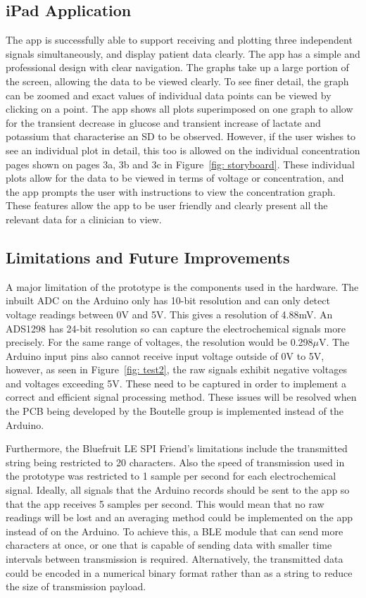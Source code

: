 \subsection{iPad Application}
The app is successfully able to support receiving and plotting three independent signals simultaneously, and display patient data clearly. The app has a simple and professional design with clear navigation. The graphs take up a large portion of the screen, allowing the data to be viewed clearly. To see finer detail, the graph can be zoomed and exact values of individual data points can be viewed by clicking on a point. The app shows all plots superimposed on one graph to allow for the transient decrease in glucose and transient increase of lactate and potassium that characterise an SD to be observed. However, if the user wishes to see an individual plot in detail, this too is allowed on the individual concentration pages shown on pages 3a, 3b and 3c in Figure~\ref{fig: storyboard}. These individual plots allow for the data to be viewed in terms of voltage or concentration, and the app prompts the user with instructions to view the concentration graph. These features allow the app to be user friendly and clearly present all the relevant data for a clinician to view.




\subsection{Limitations and Future Improvements}
A major limitation of the prototype is the components used in the hardware. The inbuilt ADC on the Arduino only has 10-bit resolution and can only detect voltage readings between 0V and 5V. This gives a resolution of 4.88mV. An ADS1298 has 24-bit resolution so can capture the electrochemical signals more precisely. For the same range of voltages, the resolution would be 0.298$\mu$V. The Arduino input pins also cannot receive input voltage outside of 0V to 5V, however, as seen in Figure~\ref{fig: test2}, the raw signals exhibit negative voltages and voltages exceeding 5V. These need to be captured in order to implement a correct and efficient signal processing method. These issues will be resolved when the PCB being developed by the Boutelle group is implemented instead of the Arduino.

Furthermore, the Bluefruit LE SPI Friend's limitations include the transmitted string being restricted to 20 characters. Also the speed of transmission used in the prototype was restricted to 1 sample per second for each electrochemical signal. Ideally, all signals that the Arduino records should be sent to the app so that the app receives 5 samples per second. This would mean that no raw readings will be lost and an averaging method could be implemented on the app instead of on the Arduino. To achieve this, a BLE module that can send more characters at once, or one that is capable of sending data with smaller time intervals between transmission is required. Alternatively, the transmitted data could be encoded in a numerical binary format rather than as a string to reduce the size of transmission payload. 

